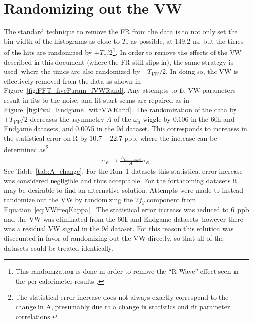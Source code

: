 \documentclass[12pt,letterpaper]{article}
\newcommand{\figref}[1]{Figure~\ref{#1}}
\def\wa{$\omega_{a}$\xspace}
\begin{document}
\clearpage

\section{Randomizing out the VW}
\label{sec:randomization}


The standard technique to remove the FR from the data is to not only set the bin width of the histograms as close to $T_{c}$ as possible, at 149.2 ns, but the times of the hits are randomized by $\pm T_{c}/2$\footnote{This randomization is done in order to remove the ``R-Wave'' effect seen in the per calorimeter results \cite{Rwave}.}. In order to remove the effects of the VW described in this document (where the FR still slips in), the same strategy is used, where the times are also randomized by $\pm T_{VW}/2$. In doing so, the VW is effectively removed from the data as shown in \figref{fig:FFT_fiveParam_fVWRand}. Any attempts to fit VW parameters result in fits to the noise, and fit start scans are repaired as in \figref{fig:Pval_Endgame_withVWRand}. The randomization of the data by $\pm T_{VW}/2$ decreases the asymmetry $A$ of the \wa wiggle by 0.006 in the 60h and Endgame datasets, and 0.0075 in the 9d dataset. This corresponds to increases in the statistical error on R by $10.7 - 22.7$ ppb, where the increase can be determined as\footnote{The statistical error increase does not always exactly correspond to the change in A, presumably due to a change in statistics and fit parameter correlations.}
    \begin{align}
        \sigma_{R} \rightarrow \frac{ A_{\text{randomized}}}{A}\sigma_{R}.
    \end{align}
See Table~\ref{tab:A_change}. For the Run~1 datasets this statistical error increase was considered negligible and thus acceptable. For the forthcoming datasets it may be desirable to find an alternative solution. Attempts were made to instead randomize out the VW by randomizing the $2f_{y}$ component from Equation~\ref{eq:VWfreqKappa} \cite{wa_presentation}. The statistical error increase was reduced to 6~ppb and the VW was eliminated from the 60h and Endgame datasets, however there was a residual VW signal in the 9d dataset. For this reason this solution was discounted in favor of randomizing out the VW directly, so that all of the datasets could be treated identically.
\end{document}
